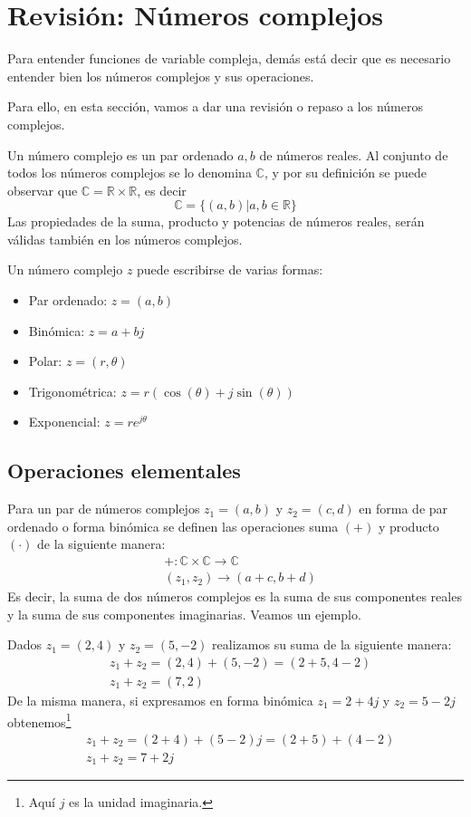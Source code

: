 \section[Números complejos]{Revisión: Números complejos}

Para entender funciones de variable compleja, demás está decir que es necesario entender bien los números complejos y sus operaciones. 

Para ello, en esta sección, vamos a dar una revisión o repaso a los números complejos.

\begin{definition}
  Un número complejo es un par ordenado \(a,b\) de números reales. Al conjunto de todos los números complejos se lo denomina $\mathbb{C}$, y por su definición se puede observar que $\mathbb{C}=\mathbb{R}\times\mathbb{R}$, es decir 
  $$
  \mathbb{C}=\{(a,b)|a,b \in \mathbb{R}\}
  $$
  Las propiedades de la suma, producto y potencias de números reales, serán válidas también en los números complejos.
\end{definition}

Un número complejo $z$ puede escribirse de varias formas:
\begin{itemize}
  \item Par ordenado: $z=(a,b)$
  \item Binómica: $z=a+bj$
  \item Polar: $z=(r,\theta)$
  \item Trigonométrica: $z=r(\cos(\theta)+j\sin(\theta))$
  \item Exponencial: $z=re^{j\theta}$
\end{itemize}

\subsection{Operaciones elementales}

Para un par de números complejos $z_1=(a,b)$ y $z_2=(c,d)$ en forma de par ordenado o forma binómica se definen las operaciones suma $(+)$ y producto $(\cdot)$ de la siguiente manera:
\begin{align*}
  &+:\mathbb{C}\times\mathbb{C}\to \mathbb{C} \\
  &(z_1,z_2)\rightarrow (a+c,b+d)
\end{align*}
Es decir, la suma de dos números complejos es la suma de sus componentes reales y la suma de sus componentes imaginarias. Veamos un ejemplo.
\begin{example}
  Dados $z_1=(2,4)$ y $z_2=(5,-2)$ realizamos su suma de la siguiente manera:
  \begin{align*}
    &z_1+z_2 = (2,4) + (5,-2) = (2+5,4-2) \\
    &\boxed{z_1+z_2 = (7,2)}
  \end{align*}
  De la misma manera, si expresamos en forma binómica $z_1=2+4j$ y $z_2=5-2j$ obtenemos\footnote{Aquí $j$ es la unidad imaginaria.}
  \begin{align*}
    &z_1+z_2 = (2+4) + (5-2)j = (2+5) + (4-2) \\
    &\boxed{z_1+z_2 = 7+2j}
  \end{align*}
\end{example}

